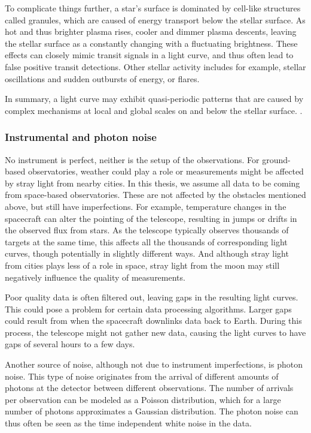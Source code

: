 To complicate things further, a star's surface is dominated by cell-like structures called granules, which are caused of energy transport below the stellar surface. As hot and thus brighter plasma rises, cooler and dimmer plasma descents, leaving the stellar surface as a constantly changing with a fluctuating brightness. These effects can closely mimic transit signals in a light curve, and thus often lead to false positive transit detections. Other stellar activity includes for example, stellar oscillations and sudden outbursts of energy, or flares.

In summary, a light curve may exhibit quasi-periodic patterns that are caused by complex mechanisms at local and global scales on and below the stellar surface. .

\subsubsection{Instrumental and photon noise}

No instrument is perfect, neither is the setup of the observations. For ground-based observatories, weather could play a role or measurements might be affected by stray light from nearby cities. In this thesis, we assume all data to be coming from space-based observatories. These are not affected by the obstacles mentioned above, but still have imperfections. For example, temperature changes in the spacecraft can alter the pointing of the telescope, resulting in jumps or drifts in the observed flux from stars. As the telescope typically observes thousands of targets at the same time, this affects all the thousands of corresponding light curves, though potentially in slightly different ways. And although stray light from cities plays less of a role in space, stray light from the moon may still negatively influence the quality of measurements.

Poor quality data is often filtered out, leaving gaps in the resulting light curves. This could pose a problem for certain data processing algorithms. Larger gaps could result from when the spacecraft downlinks data back to Earth. During this process, the telescope might not gather new data, causing the light curves to have gaps of several hours to a few days.

Another source of noise, although not due to instrument imperfections, is photon noise. This type of noise originates from the arrival of different amounts of photons at the detector between different observations. The number of arrivals per observation can be modeled as a Poisson distribution, which for a large number of photons approximates a Gaussian distribution. The photon noise can thus often be seen as the time independent white noise in the data.

